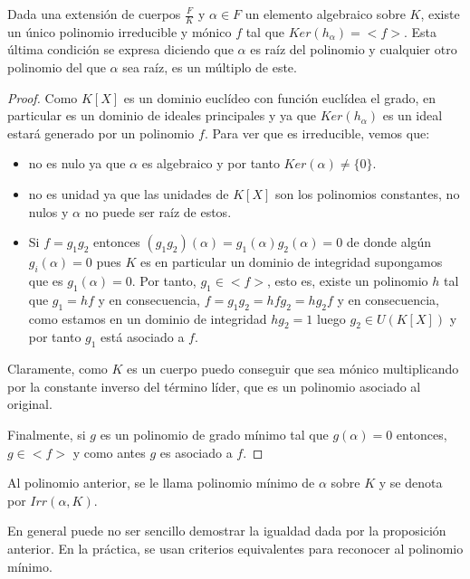 \begin{proposition}
Dada una extensión de cuerpos $\frac{F}{K}$ y $\alpha \in F$ un elemento algebraico sobre $K$, existe un único polinomio irreducible y mónico $f$ tal que $Ker(h_\alpha) = <f>$. Esta última condición se expresa diciendo que $\alpha$ es raíz del polinomio y cualquier otro polinomio del que $\alpha$ sea raíz, es un múltiplo de este. 
\end{proposition}
\begin{proof}
Como $K[X]$ es un dominio euclídeo con función euclídea el grado, en particular es un dominio de ideales principales y ya que $Ker(h_\alpha)$ es un ideal estará generado por un polinomio $f$. Para ver que es irreducible, vemos que:

\begin{itemize}
\item no es nulo ya que $\alpha$ es algebraico y por tanto $Ker(\alpha) \neq \{0\}$. 
\item no es unidad ya que las unidades de $K[X]$ son los polinomios constantes, no nulos y $\alpha$ no puede ser raíz de estos. 
\item Si $f = g_1g_2$ entonces $(g_1g_2)(\alpha) = g_1(\alpha)g_2(\alpha) = 0$ de donde algún $g_i(\alpha) = 0$ pues $K$ es en particular un dominio de integridad supongamos que es $g_1(\alpha) = 0$. Por tanto, $g_1 \in <f>$, esto es, existe un polinomio $h$ tal que $g_1 = hf$ y en consecuencia, $f = g_1g_2 = hfg_2 = hg_2f$ y en consecuencia, como estamos en un dominio de integridad $hg_2 = 1$ luego $g_2 \in U(K[X])$ y por tanto $g_1$ está asociado a $f$. 
\end{itemize}

Claramente, como $K$ es un cuerpo puedo conseguir que sea mónico multiplicando por la constante inverso del término líder, que es un polinomio asociado al original. 

Finalmente, si $g$ es un polinomio de grado mínimo tal que $g(\alpha) = 0$ entonces, $g \in <f>$ y como antes $g$ es asociado a $f$.

\end{proof}

\begin{definition}
	Al polinomio anterior, se le llama polinomio mínimo de $\alpha$ sobre $K$ y se denota por $Irr(\alpha,K)$. 
\end{definition}

En general puede no ser sencillo demostrar la igualdad dada por la proposición anterior. En la práctica, se usan criterios equivalentes para reconocer al polinomio mínimo.

